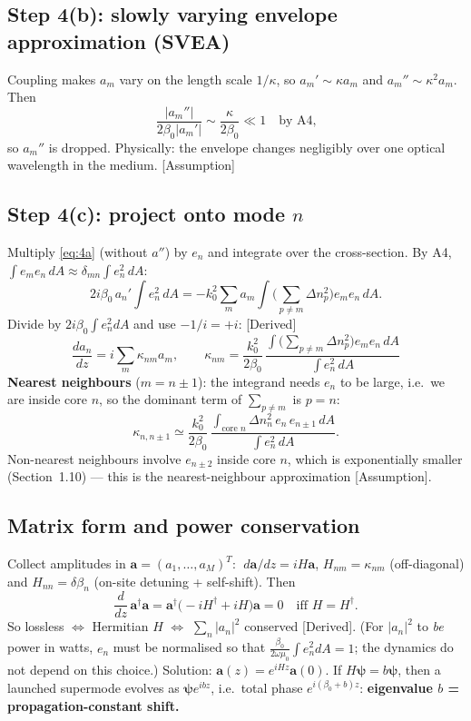 \documentclass[10pt,a4paper]{article}
\newcommand{\evd}[1]{\textsf{\small[#1]}}
\begin{document}
\subsection{Step 4(b): slowly varying envelope approximation (SVEA)}
Coupling makes $a_m$ vary on the length scale $1/\kappa$, so $a_m'\sim\kappa a_m$ and $a_m''\sim\kappa^2a_m$. Then
\[
\frac{|a_m''|}{2\beta_0|a_m'|}\sim\frac{\kappa}{2\beta_0}\ll1\quad\text{by A4,}
\]
so $a_m''$ is dropped. Physically: the envelope changes negligibly over one optical wavelength in the medium. \evd{Assumption}

\subsection{Step 4(c): project onto mode $n$}
Multiply \eqref{eq:4a} (without $a''$) by $e_n$ and integrate over the cross-section. By A4, $\int e_me_n\,dA\approx\delta_{mn}\int e_n^2\,dA$:
\[
2i\beta_0\,a_n'\int e_n^2\,dA=-k_0^2\sum_m a_m\int\Big(\sum_{p\neq m}\Delta n_p^2\Big)e_me_n\,dA .
\]
Divide by $2i\beta_0\int e_n^2dA$ and use $-1/i=+i$: \evd{Derived}
\begin{equation}
\boxed{\ \frac{da_n}{dz}=i\sum_m\kappa_{nm}a_m,\qquad
\kappa_{nm}=\frac{k_0^2}{2\beta_0}\,\frac{\int\big(\sum_{p\neq m}\Delta n_p^2\big)e_m e_n\,dA}{\int e_n^2\,dA}\ }\label{eq:cmt}
\end{equation}
\textbf{Nearest neighbours} ($m=n\pm1$): the integrand needs $e_n$ to be large, i.e.\ we are inside core $n$, so the dominant term of $\sum_{p\neq m}$ is $p=n$:
\begin{equation}
\kappa_{n,n\pm1}\simeq\frac{k_0^2}{2\beta_0}\,\frac{\int_{\text{core }n}\Delta n_n^2\,e_n\,e_{n\pm1}\,dA}{\int e_n^2\,dA}. \label{eq:kappa}
\end{equation}
Non-nearest neighbours involve $e_{n\pm2}$ inside core $n$, which is exponentially smaller (Section~1.10) --- this is the nearest-neighbour approximation \evd{Assumption}.

\subsection{Matrix form and power conservation}
Collect amplitudes in $\bm a=(a_1,\dots,a_M)^T$: $\;d\bm a/dz=iH\bm a$, $H_{nm}=\kappa_{nm}$ (off-diagonal) and $H_{nn}=\delta\beta_n$ (on-site detuning + self-shift). Then
\[
\frac{d}{dz}\,\bm a^\dagger\bm a=\bm a^\dagger\big(-iH^\dagger+iH\big)\bm a=0\quad\text{iff }H=H^\dagger .
\]
So lossless $\Leftrightarrow$ Hermitian $H$ $\Leftrightarrow$ $\sum_n|a_n|^2$ conserved \evd{Derived}. (For $|a_n|^2$ to \emph{be} power in watts, $e_n$ must be normalised so that $\frac{\beta_0}{2\omega\mu_0}\int e_n^2dA=1$; the dynamics do not depend on this choice.)
Solution: $\bm a(z)=e^{iHz}\bm a(0)$. If $H\bm\psi=b\bm\psi$, then a launched supermode evolves as $\bm\psi e^{ibz}$, i.e.\ total phase $e^{i(\beta_0+b)z}$: \textbf{eigenvalue $b$ = propagation-constant shift.}
\end{document}
